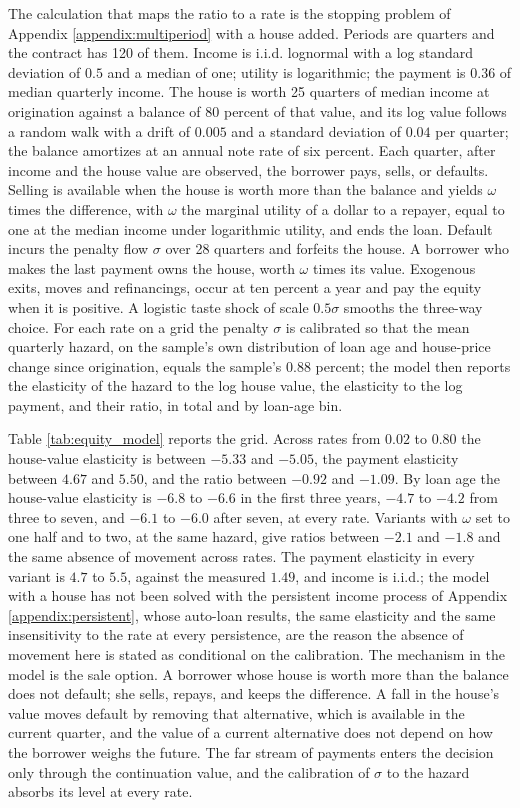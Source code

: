 The calculation that maps the ratio to a rate is the stopping problem of Appendix \ref{appendix:multiperiod} with a house added. Periods are quarters and the contract has 120 of them. Income is i.i.d. lognormal with a log standard deviation of $0.5$ and a median of one; utility is logarithmic; the payment is $0.36$ of median quarterly income. The house is worth 25 quarters of median income at origination against a balance of 80 percent of that value, and its log value follows a random walk with a drift of $0.005$ and a standard deviation of $0.04$ per quarter; the balance amortizes at an annual note rate of six percent. Each quarter, after income and the house value are observed, the borrower pays, sells, or defaults. Selling is available when the house is worth more than the balance and yields $\omega$ times the difference, with $\omega$ the marginal utility of a dollar to a repayer, equal to one at the median income under logarithmic utility, and ends the loan. Default incurs the penalty flow $\sigma$ over 28 quarters and forfeits the house. A borrower who makes the last payment owns the house, worth $\omega$ times its value. Exogenous exits, moves and refinancings, occur at ten percent a year and pay the equity when it is positive. A logistic taste shock of scale $0.5\sigma$ smooths the three-way choice. For each rate on a grid the penalty $\sigma$ is calibrated so that the mean quarterly hazard, on the sample's own distribution of loan age and house-price change since origination, equals the sample's $0.88$ percent; the model then reports the elasticity of the hazard to the log house value, the elasticity to the log payment, and their ratio, in total and by loan-age bin.

Table \ref{tab:equity_model} reports the grid. Across rates from $0.02$ to $0.80$ the house-value elasticity is between $-5.33$ and $-5.05$, the payment elasticity between $4.67$ and $5.50$, and the ratio between $-0.92$ and $-1.09$. By loan age the house-value elasticity is $-6.8$ to $-6.6$ in the first three years, $-4.7$ to $-4.2$ from three to seven, and $-6.1$ to $-6.0$ after seven, at every rate. Variants with $\omega$ set to one half and to two, at the same hazard, give ratios between $-2.1$ and $-1.8$ and the same absence of movement across rates. The payment elasticity in every variant is $4.7$ to $5.5$, against the measured $1.49$, and income is i.i.d.; the model with a house has not been solved with the persistent income process of Appendix \ref{appendix:persistent}, whose auto-loan results, the same elasticity and the same insensitivity to the rate at every persistence, are the reason the absence of movement here is stated as conditional on the calibration. The mechanism in the model is the sale option. A borrower whose house is worth more than the balance does not default; she sells, repays, and keeps the difference. A fall in the house's value moves default by removing that alternative, which is available in the current quarter, and the value of a current alternative does not depend on how the borrower weighs the future. The far stream of payments enters the decision only through the continuation value, and the calibration of $\sigma$ to the hazard absorbs its level at every rate.


